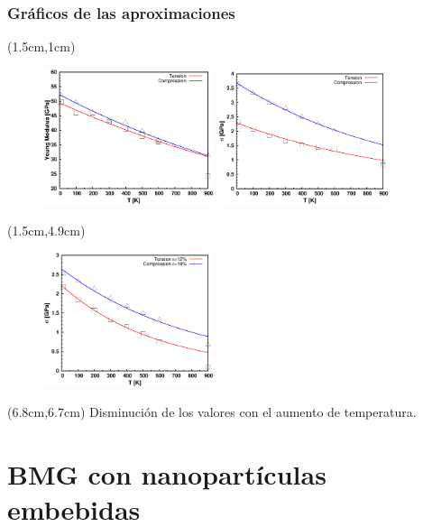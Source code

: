 \documentclass[12pt,t]{beamer}
\begin{document}
\begin{frame}
 \frametitle{Gr\'aficos de las aproximaciones}
 \begin{textblock*}{10cm}(1.5cm,1cm)
 \begin{figure}[htp]
    \centering
    \includegraphics[width=5cm]{Presentacion_Mecom_2012/young_T_both.eps}
    \includegraphics[width=5cm]{Presentacion_Mecom_2012/peakstress_T_BOTH.eps}
  \end{figure} 
 \end{textblock*}
 \begin{textblock*}{5cm}(1.5cm,4.9cm)
   \begin{figure}[htp]
    \centering
    \includegraphics[width=5cm]{Presentacion_Mecom_2012/defstress_T_BOTH.eps}
  \end{figure} 
 \end{textblock*}
 \begin{textblock*}{5cm}(6.8cm,6.7cm)
  \centering
   Disminuci\'on de los valores con el aumento de temperatura.
  \end{textblock*}
\end{frame}



\section[BMG con nanopart\'iculas]{BMG con nanopart\'iculas embebidas}
\end{document}
